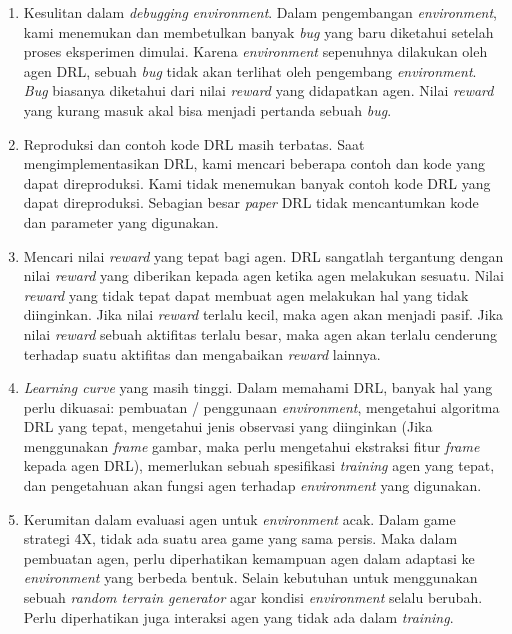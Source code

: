 \begin{enumerate}[nolistsep]
  \item Kesulitan dalam \emph{debugging} \emph{environment}. 
  Dalam pengembangan \emph{environment}, 
  kami menemukan dan membetulkan banyak \emph{bug} yang baru diketahui setelah proses eksperimen dimulai.
  Karena \emph{environment} sepenuhnya dilakukan oleh agen DRL, sebuah \emph{bug} tidak akan terlihat oleh pengembang \emph{environment}.
  \emph{Bug} biasanya diketahui dari nilai \emph{reward} yang didapatkan agen.
  Nilai \emph{reward} yang kurang masuk akal bisa menjadi pertanda sebuah \emph{bug}.

  \item Reproduksi dan contoh kode DRL masih terbatas.
  Saat mengimplementasikan DRL, kami mencari beberapa contoh dan kode yang dapat direproduksi.
  Kami tidak menemukan banyak contoh kode DRL yang dapat direproduksi.
  Sebagian besar \emph{paper} DRL tidak mencantumkan kode dan parameter yang digunakan.
  
  \item Mencari nilai \emph{reward} yang tepat bagi agen.
  DRL sangatlah tergantung dengan nilai \emph{reward} yang diberikan kepada agen ketika agen melakukan sesuatu.
  Nilai \emph{reward} yang tidak tepat dapat membuat agen melakukan hal yang tidak diinginkan.
  Jika nilai \emph{reward} terlalu kecil, maka agen akan menjadi pasif.
  Jika nilai \emph{reward} sebuah aktifitas terlalu besar, maka agen akan terlalu cenderung terhadap suatu aktifitas dan mengabaikan \emph{reward} lainnya.

  \item \emph{Learning curve} yang masih tinggi.
  Dalam memahami DRL, banyak hal yang perlu dikuasai: pembuatan / penggunaan \emph{environment},
  mengetahui algoritma DRL yang tepat, mengetahui jenis observasi yang diinginkan (Jika menggunakan \emph{frame} gambar, maka perlu mengetahui ekstraksi fitur \emph{frame} kepada agen DRL),
  memerlukan sebuah spesifikasi \emph{training} agen yang tepat, dan pengetahuan akan fungsi agen terhadap \emph {environment} yang digunakan.

  \item Kerumitan dalam evaluasi agen untuk \emph{environment} acak. 
  Dalam game strategi 4X, tidak ada suatu area game yang sama persis.
  Maka dalam pembuatan agen, perlu diperhatikan kemampuan agen dalam adaptasi ke \emph{environment} yang berbeda bentuk.
  Selain kebutuhan untuk menggunakan sebuah \emph{random terrain generator} agar kondisi \emph{environment} selalu berubah.
  Perlu diperhatikan juga interaksi agen yang tidak ada dalam \emph{training}.
  

\end{enumerate}
